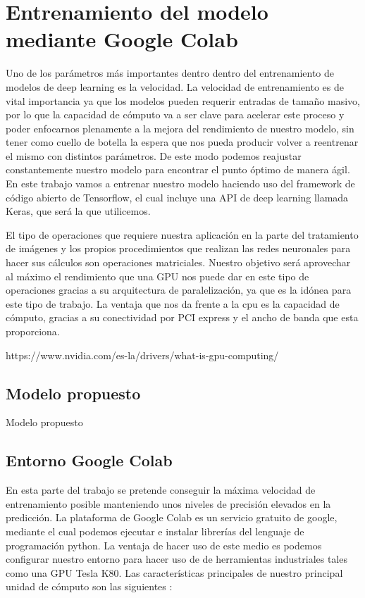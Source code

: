 \mbox{}


\chapter{Entrenamiento del modelo mediante Google Colab}
\label{ch:chapter2}
Uno de los parámetros más importantes dentro dentro del entrenamiento de modelos de deep learning es la velocidad.
La velocidad de entrenamiento es de vital importancia ya que los modelos pueden requerir entradas de tamaño masivo, por lo que la capacidad de cómputo
va a ser clave para acelerar este proceso y poder enfocarnos plenamente a la mejora del rendimiento de nuestro modelo, sin tener como cuello de botella la espera
que nos pueda producir volver a reentrenar el mismo con distintos parámetros.
De este modo podemos reajustar constantemente nuestro modelo para encontrar el punto óptimo de manera ágil.
En este trabajo vamos a entrenar nuestro modelo haciendo uso del framework de código abierto de Tensorflow, el cual incluye una API de deep learning llamada Keras, que será la que utilicemos.

El tipo de operaciones que requiere nuestra aplicación en la parte del tratamiento de imágenes y los propios procedimientos que realizan las redes neuronales
para hacer sus cálculos son operaciones matriciales.
Nuestro objetivo será aprovechar al máximo el rendimiento que una GPU nos puede dar en este tipo de operaciones gracias
a su arquitectura de paralelización, ya que es la idónea para este tipo de trabajo.
La ventaja que nos da frente a la cpu es la capacidad de cómputo, gracias a su conectividad por PCI express y el ancho de banda que esta proporciona.

https://www.nvidia.com/es-la/drivers/what-is-gpu-computing/

\section{Modelo propuesto}\label{sec:modelo-propuesto}
Modelo propuesto
\section{Entorno Google Colab}\label{sec:entorno-google-colab}
En esta parte del trabajo se pretende conseguir la máxima velocidad de entrenamiento posible manteniendo unos niveles de precisión elevados en la predicción.
La plataforma de Google Colab es un servicio gratuito de google, mediante el cual podemos ejecutar e instalar librerías del lenguaje de programación python.
La ventaja de hacer uso de este medio es podemos configurar nuestro entorno para hacer uso de de herramientas industriales tales como una GPU Tesla K80.
Las características principales de nuestro principal unidad de cómputo son las siguientes :

